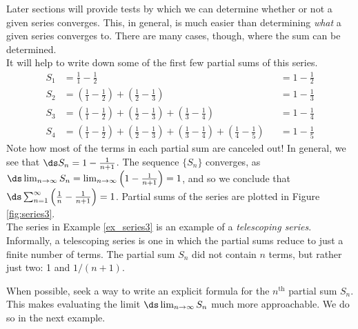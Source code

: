 Later sections will provide tests by which we can determine whether or not a given series converges. This, in general, is much easier than determining \emph{what} a given series converges to. There are many cases, though, where the sum can be determined. \\


{It will help to write down some of the first few partial sums of this series.
\begin{align*}
S_1 &=	\frac11-\frac12 & & = 1-\frac12\\
S_2 &=	\left(\frac11-\frac12\right) + \left(\frac12-\frac13\right) & & = 1-\frac13\\
S_3 &=	\left(\frac11-\frac12\right) + \left(\frac12-\frac13\right)+\left(\frac13-\frac14\right) & &= 1-\frac14\\
S_4 &=	\left(\frac11-\frac12\right) + \left(\frac12-\frac13\right)+\left(\frac13-\frac14\right) +\left(\frac14-\frac15\right)& &= 1-\frac15
\end{align*}
Note how most of the terms in each partial sum are canceled out! In general, we see that $\ds S_n = 1-\frac{1}{n+1}$. The sequence $\{S_n\}$ converges,  as $\ds \lim_{n\to\infty}S_n = \lim_{n\to\infty}\left(1-\frac1{n+1}\right) = 1$, and so we conclude that $\ds \sum_{n=1}^\infty \left(\frac1n-\frac1{n+1}\right) = 1$. Partial sums of the series are plotted in Figure \ref{fig:series3}.
}\\

The series in Example \ref{ex_series3} is an example of a \emph{telescoping series}. Informally, a telescoping series is one in which the partial sums reduce to just a finite number of terms. The partial sum $S_n$ did not contain $n$ terms, but rather just two: 1 and $1/(n+1)$.

When possible, seek a way to write an explicit formula for the $n^\text{th}$ partial sum $S_n$. This makes evaluating the limit $\ds\lim_{n\to\infty} S_n$ much more approachable. We do so in the next example.\\




